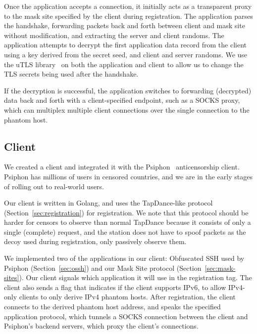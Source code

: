 \documentclass[sigconf,anonymous]{acmart}
\begin{document}
Once the application accepts a connection, it initially acts as a transparent
proxy to the mask site specified by the client during registration. The
application parses the handshake, forwarding packets back and forth between
client and mask site without modification, and extracting the server and client
randoms. The application attempts to decrypt the first application data record
from the client using a key derived from the secret seed, and client and server
randoms. We use the uTLS library~\cite{utls} on both the application and client
to allow us to change the TLS secrets being used after the handshake.

\FigTapBandwidth

If the decryption is successful, the application switches to forwarding
(decrypted) data back and forth with a client-specified endpoint, such as a
SOCKS proxy, which can multiplex multiple client connections over the single
connection to the phantom host.

\subsection{Client}


We created a \scheme client and integrated it with the Psiphon~\cite{psiphon}
anticensorship client. Psiphon has millions of users in censored countries, and
we are in the early stages of rolling \scheme out to real-world users.

Our \scheme client is written in Golang, and uses the TapDance-like protocol
(Section~\ref{sec:registration}) for
registration. We note that this protocol should be harder for censors to observe
than normal TapDance because it consists of only a single (complete) request, and the station does
not have to spoof packets as the decoy used during registration, only passively
observe them.

We implemented two of the applications in our client: Obfuscated SSH used by
Psiphon
(Section~\ref{sec:ossh}) and our Mask Site protocol
(Section~\ref{sec:mask-sites}). Our client signals which application it will use
in the registration tag. The client also sends a flag that indicates if the
client supports IPv6, to allow IPv4-only clients to only derive IPv4 phantom
hosts.
After registration, the client connects to the derived
phantom host address, and speaks the specified application protocol, which
tunnels a SOCKS connection between the client and Psiphon's backend servers,
which proxy the client's connections.
\end{document}
